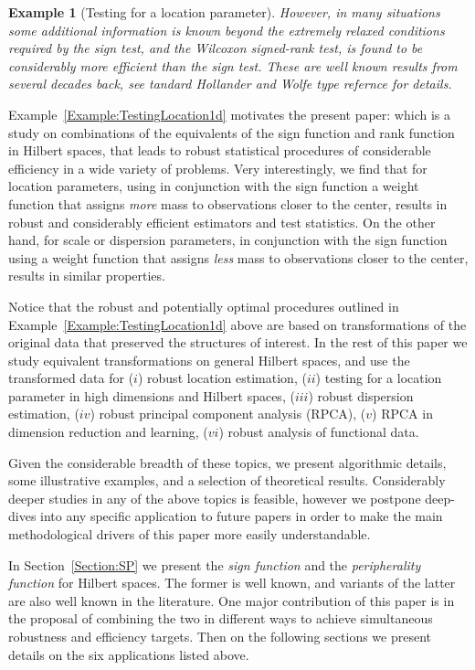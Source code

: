 \documentclass[12pt,letterpaper]{article}
\def\bredbf#1\eredbf{{\color{red}{\bf ???? #1 ????}}}
\theoremstyle{Example}
\newtheorem{Example}{Example}[section]
\begin{document}
\begin{Example}[Testing for a location parameter]
However, in many situations some additional information is known beyond the 
extremely relaxed conditions required by the sign test, and the Wilcoxon 
signed-rank test,  is found to be considerably more efficient than the sign test. 
These are well known results from several decades back, see 
\bredbf
Standard Hollander and Wolfe type refernce
\eredbf
for details.

\end{Example}


Example~\ref{Example:TestingLocation1d} motivates the present paper: which is a 
study on combinations of the equivalents of the sign function and rank function 
in Hilbert spaces, that leads to robust statistical procedures of considerable efficiency 
in a wide variety of problems. Very interestingly, we find that for location 
parameters, using in conjunction with the sign function a weight function that 
assigns {\it more} mass to observations closer to the center, results in   robust  
and considerably efficient estimators and test statistics. On the other hand, for 
scale or dispersion parameters, in conjunction with the sign function using a weight 
function that assigns {\it less} mass to observations closer to the center, 
results in  similar properties. 

Notice that the robust and potentially optimal procedures outlined in 
Example~\ref{Example:TestingLocation1d}  above are based on transformations of the 
original data that preserved the structures of interest. In the rest of this paper we 
study equivalent transformations on general Hilbert spaces, and use the transformed data 
for ($i$) robust location estimation, ($ii$) testing for a location parameter in 
high dimensions and Hilbert spaces, ($iii$) robust dispersion estimation, ($iv$) 
robust principal component analysis (RPCA), ($v$) RPCA in dimension reduction and 
learning, ($vi$) robust analysis of functional data. 

Given the considerable breadth of these topics, we present algorithmic details, some 
illustrative examples, and a selection of theoretical results. Considerably deeper studies 
in any of the above topics is feasible, however we postpone deep-dives into any 
specific application to future papers in order to make the main methodological drivers 
of this paper more easily understandable.

In Section~\ref{Section:SP} we present the {\it sign function} and the 
{\it peripherality function} for Hilbert spaces. The former is well known, and variants of 
the latter are also well known  in the literature. One major contribution of this 
paper is in the proposal of combining the two in different ways to achieve 
simultaneous robustness and efficiency targets. Then on the following sections we 
present details on the six applications listed above.
\end{document}
